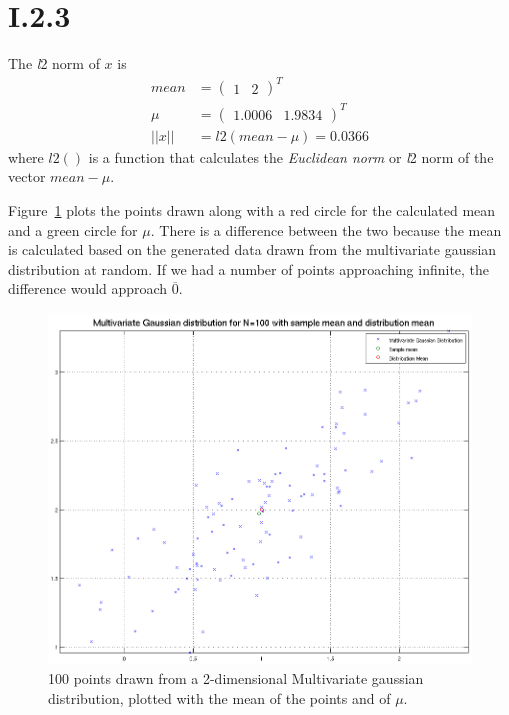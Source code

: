 \section*{I.2.3}
The \textit{l}2 norm of $x$ is
\begin{align*}
	mean  &= \begin{pmatrix}1 & 2\end{pmatrix}^T \\
	\mu   &= \begin{pmatrix}1.0006 & 1.9834\end{pmatrix}^T \\
	||x|| &= l2(mean - \mu) = 0.0366
\end{align*}
where $l2()$ is a function that calculates the \textit{Euclidean norm} or \textit{l}2
norm of the vector $mean - \mu$.

Figure~\ref{fig:I.2.3} plots the points drawn along with a red circle for the
calculated mean and a green circle for $\mu$. There is a difference between the
two because the mean is calculated based on the generated data drawn from the
multivariate gaussian distribution at random. If we had a number of points
approaching infinite, the difference would approach $\overline{0}$.

\begin{figure}[h!]
	\includegraphics[width=\textwidth]{img/multigaussmeanxy}
	\caption{100 points drawn from a 2-dimensional Multivariate gaussian
          distribution, plotted with the mean of the points and of $\mu$.
        \label{fig:I.2.3}}
\end{figure}

